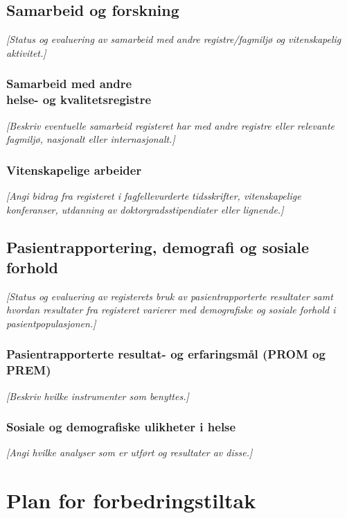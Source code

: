 \documentclass[norsk, a4paper, twocolumn]{report}
\newcommand{\guide}[1] {
	\textit{[\textcolor{guidegray}{#1}]}
	}
\begin{document}
\chapter{Samarbeid og forskning}\label{cha:for}
\guide{Status og evaluering av samarbeid med andre registre/fagmiljø og  vitenskapelig aktivitet.}

\section{Samarbeid med andre\\helse- og kvalitetsregistre}\label{sec:samfag}
\guide{Beskriv eventuelle samarbeid registeret har med andre registre eller relevante fagmiljø, nasjonalt eller internasjonalt.}

\section{Vitenskapelige arbeider}\label{sec:vitarb}
\guide{Angi bidrag fra registeret i fagfellevurderte tidsskrifter,
vitenskapelige konferanser, utdanning av doktorgradsstipendiater eller
lignende.}



\chapter{Pasientrapportering, demografi og sosiale forhold}\label{cha:pas}
\guide{Status og evaluering av registerets bruk av pasientrapporterte
resultater samt
hvordan resultater fra registeret varierer med demografiske og sosiale forhold
i pasientpopulasjonen.}

\section{Pasientrapporterte resultat- og erfaringsmål (PROM og PREM)}\label{sec:pasutk}
\guide{Beskriv hvilke instrumenter som benyttes.}


\section{Sosiale og demografiske ulikheter i helse}\label{sec:sosdem}
\guide{Angi hvilke analyser som er utført og resultater av disse.}


\onecolumn



\part{Plan for forbedringstiltak}\label{par:for}
\end{document}
